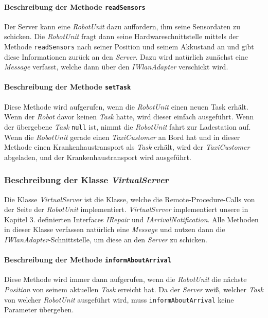 			\paragraph{Beschreibung der Methode \texttt{readSensors}}
			Der Server kann eine \textit{RobotUnit} dazu auffordern, ihm seine Sensordaten zu schicken. 
			Die \textit{RobotUnit} fragt dann seine Hardwareschnittstelle mittels der Methode \texttt{readSensors} 
			nach seiner Position und seinem Akkustand an und gibt diese Informationen zurück an den \textit{Server}. 
			Dazu wird natürlich zunächst eine \textit{Message} verfasst, welche dann über den \textit{IWlanAdapter} verschickt wird.
			
			\paragraph{Beschreibung der Methode \texttt{setTask}}
			Diese Methode wird aufgerufen, wenn die \textit{RobotUnit} einen neuen Task erhält. Wenn der \textit{Robot} davor keinen \textit{Task} hatte, wird dieser einfach ausgeführt. Wenn der übergebene \textit{Task} \texttt{null} ist, nimmt die \textit{RobotUnit} fahrt zur Ladestation auf. Wenn die \textit{RobotUnit} gerade einen \textit{TaxiCustomer} an Bord hat und in dieser Methode einen Krankenhaustransport als \textit{Task} erhält, wird der \textit{TaxiCustomer} abgeladen, und der Krankenhaustransport wird ausgeführt.
			
	\subsubsection{Beschreibung der Klasse \textit{VirtualServer}}
	Die Klasse \textit{VirtualServer} ist die Klasse, welche die Remote-Procedure-Calls von der Seite der \textit{RobotUnit} implementiert. \textit{VirtualServer} implementiert unsere in Kapitel 3. definierten Interfaces \textit{IRepair} und \textit{IArrivalNotification}. Alle Methoden in dieser Klasse verfassen natürlich eine \textit{Message} und nutzen dann die \textit{IWlanAdapter}-Schnittstelle, um diese an den \textit{Server} zu schicken.
	
			\paragraph{Beschreibung der Methode \texttt{informAboutArrival}}
			Diese Methode wird immer dann aufgerufen, wenn die \textit{RobotUnit} die nächste \textit{Position} von seinem aktuellen \textit{Task} erreicht hat.  Da der \textit{Server} weiß, welcher \textit{Task} von welcher \textit{RobotUnit} ausgeführt wird, muss \texttt{informAboutArrival} keine Parameter übergeben.
	
